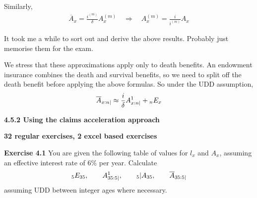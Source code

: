 \documentclass[hidelinks, 12pt]{article}
\theoremstyle{mydefstyle}
\theoremstyle{mythmstyle}
\begin{document}
Similarly,
\begin{gather*}
\overline{A}_x = \frac{i^{(m)}}{\delta} A^{(m)}_x \quad\Rightarrow\quad A^{(m)}_x = \frac{i}{i^{(m)}}A_x
\end{gather*}

It took me a while to sort out and derive the above results. Probably just memorise them for the exam. 

We stress that these approximations apply only to death benefits. An endowment insurance combines the death and survival benefits, so we need to split off the death benefit before applying the above formulas. So under the UDD assumption,
\begin{gather*}
\overline{A}_{x:n|} \approx \frac{i}{\delta} A_{x:n|}^1 + \hspace{0mm}_nE_x
\end{gather*}

\color{red}
\textbf{4.5.2 Using the claims acceleration approach}
\color{black}

\textbf{32 regular exercises, 2 excel based exercises}

\textbf{Exercise 4.1} You are given the following table of values for $l_x$ and $A_x$, assuming an effective interest rate of $6\%$ per year. Calculate
\begin{gather*}
\hspace{0mm}_5E_{35}, \qquad A_{35:5|}^1, \qquad \hspace{0mm}_5\vert A_{35}, \qquad \overline{A}_{35:5|}
\end{gather*}
assuming UDD between integer ages where necessary. 
\end{document}
